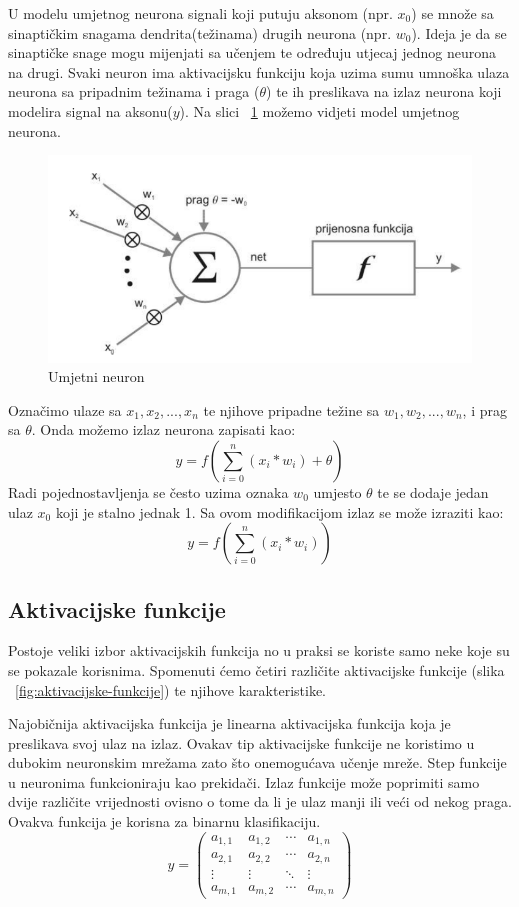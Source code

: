\documentclass[times, utf8, zavrsni]{fer}
\begin{document}
U modelu umjetnog neurona signali koji putuju aksonom (npr. \textbf{$x_{0}$}) se množe sa sinaptičkim snagama dendrita(težinama) drugih neurona (npr. \textbf{$w_{0}$}). Ideja je da se sinaptičke snage mogu mijenjati sa učenjem te određuju utjecaj jednog neurona na drugi. Svaki neuron ima aktivacijsku funkciju koja uzima sumu umnoška ulaza neurona sa pripadnim težinama i praga ($\theta$) te ih preslikava na izlaz neurona koji modelira signal na aksonu($y$). Na slici ~\ref{fig:umj-neuron} možemo vidjeti model umjetnog neurona. 
\begin{figure}
    \centering
    \includegraphics[width=12cm]{img/umj-neuron.png}
    \caption{Umjetni neuron}
    \label{fig:umj-neuron}
\end{figure}

Označimo ulaze sa $x_{1},x_{2},...,x_{n}$ te njihove pripadne težine sa $w_{1},w_{2},...,w_{n}$, i prag sa $\theta$. Onda možemo izlaz neurona zapisati kao:
$$ y = f(\displaystyle\sum_{i=0}^{n}(x_i*w_i) + \theta) $$
Radi pojednostavljenja se često uzima oznaka $w_0$ umjesto $\theta$ te se dodaje jedan ulaz $x_0$ koji je stalno jednak 1. Sa ovom modifikacijom izlaz se može izraziti kao:
$$ y = f(\displaystyle\sum_{i=0}^{n}(x_i*w_i)) $$
\subsection{Aktivacijske funkcije}
Postoje veliki izbor aktivacijskih funkcija no u praksi se koriste samo neke koje su se pokazale korisnima. Spomenuti ćemo četiri različite aktivacijske funkcije (slika ~\ref{fig:aktivacijske-funkcije}) te njihove karakteristike.

Najobičnija aktivacijska funkcija je linearna aktivacijska funkcija koja je preslikava svoj ulaz na izlaz. Ovakav tip aktivacijske funkcije ne koristimo u dubokim neuronskim mrežama zato što onemogućava učenje mreže. Step funkcije u neuronima funkcioniraju kao prekidači. Izlaz funkcije može poprimiti samo dvije različite vrijednosti ovisno o tome da li je ulaz manji ili veći od nekog praga. Ovakva funkcija je korisna za binarnu klasifikaciju.
$$ y = \begin{pmatrix}
  a_{1,1} & a_{1,2} & \cdots & a_{1,n} \\
  a_{2,1} & a_{2,2} & \cdots & a_{2,n} \\
  \vdots  & \vdots  & \ddots & \vdots  \\
  a_{m,1} & a_{m,2} & \cdots & a_{m,n}
 \end{pmatrix}
$$
\end{document}
